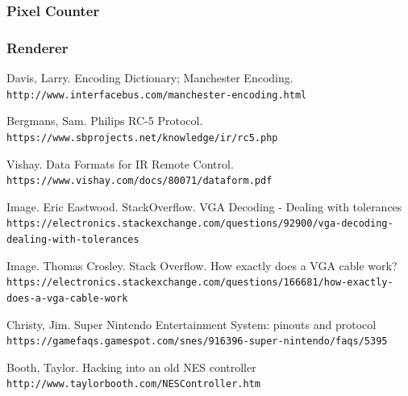 \documentclass[]{article}
\begin{document}
\subsubsection{Pixel Counter}

\subsubsection{Renderer}


\begin{thebibliography}{99}
    Davis, Larry. Encoding Dictionary; Manchester Encoding.
    \\\texttt{http://www.interfacebus.com/manchester-encoding.html}

    Bergmans, Sam. Philips RC-5 Protocol.
    \\\texttt{https://www.sbprojects.net/knowledge/ir/rc5.php}

    Vishay. Data Formats for IR Remote Control. 
    \\\texttt{https://www.vishay.com/docs/80071/dataform.pdf}
    
    Image. Eric Eastwood. StackOverflow.  VGA Decoding - Dealing with tolerances
    \\\texttt{https://electronics.stackexchange.com/questions/92900/vga-decoding-dealing-with-tolerances}
    
    Image. Thomas Crosley. Stack Overflow.  How exactly does a VGA cable work?
    \\\texttt{https://electronics.stackexchange.com/questions/166681/how-exactly-does-a-vga-cable-work}

    Christy, Jim. Super Nintendo Entertainment System: pinouts and protocol
    \\\texttt{https://gamefaqs.gamespot.com/snes/916396-super-nintendo/faqs/5395}

    Booth, Taylor. Hacking into an old NES controller
    \\\texttt{http://www.taylorbooth.com/NESController.htm}
\end{thebibliography}
\end{document}
